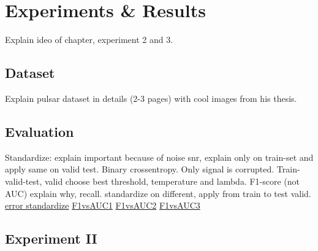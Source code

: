 \chapter{Experiments \& Results} 
\label{chapter-6} 

Explain ideo of chapter, experiment 2 and 3.


\section{Dataset}

Explain pulsar dataset in details (2-3 pages) with cool images from his thesis. 


\section{Evaluation}

Standardize: explain important because of noise snr, explain only on train-set and apply same on valid test. Binary crossentropy. Only signal is corrupted. Train-valid-test, valid choose best threshold, temperature and lambda. F1-score (not AUC) explain why, recall. standardize on different, apply from train to test valid. 
\href{https://stats.stackexchange.com/questions/327294/data-standardization-for-training-and-testing-sets-for-different-scenarios}{error standardize}
\href{https://stats.stackexchange.com/questions/210700/how-to-choose-between-roc-auc-and-f1-score}{F1vsAUC1}
\href{https://www.quora.com/What-does-it-mean-to-have-high-AUC-but-low-F1-score}{F1vsAUC2}
\href{https://stackoverflow.com/questions/44172162/f1-score-vs-roc-auc}{F1vsAUC3}


\section{Experiment II}

